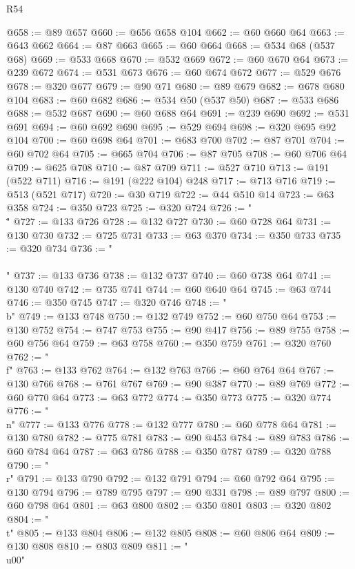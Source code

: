 \begin{lexlean}{R54}
\begin{coremodule}
@658 := @89 @657
@660 := @656 @658 @104
@662 := @60 @660 @64
@663 := @643 @662
@664 := @87 @663
@665 := @60 @664
@668 := @534 @68 (@537 @68)
@669 := @533 @668
@670 := @532 @669
@672 := @60 @670 @64
@673 := @239 @672
@674 := @531 @673
@676 := @60 @674 @672
@677 := @529 @676
@678 := @320 @677
@679 := @90 @71
@680 := @89 @679
@682 := @678 @680 @104
@683 := @60 @682
@686 := @534 @50 (@537 @50)
@687 := @533 @686
@688 := @532 @687
@690 := @60 @688 @64
@691 := @239 @690
@692 := @531 @691
@694 := @60 @692 @690
@695 := @529 @694
@698 := @320 @695 @92 @104
@700 := @60 @698 @64
@701 := @683 @700
@702 := @87 @701
@704 := @60 @702 @64
@705 := @665 @704
@706 := @87 @705
@708 := @60 @706 @64
@709 := @625 @708
@710 := @87 @709
@711 := @527 @710
@713 := @191 (@522 @711)
@716 := @191 (@222 @104) @248
@717 := @713 @716
@719 := @513 (@521 @717)
@720 := @30 @719
@722 := @44 @510 @14
@723 := @63 @358
@724 := @350 @723
@725 := @320 @724
@726 := "\\\""
@727 := @133 @726
@728 := @132 @727
@730 := @60 @728 @64
@731 := @130 @730
@732 := @725 @731
@733 := @63 @370
@734 := @350 @733
@735 := @320 @734
@736 := "\\\\"
@737 := @133 @736
@738 := @132 @737
@740 := @60 @738 @64
@741 := @130 @740
@742 := @735 @741
@744 := @60 @640 @64
@745 := @63 @744
@746 := @350 @745
@747 := @320 @746
@748 := "\\b"
@749 := @133 @748
@750 := @132 @749
@752 := @60 @750 @64
@753 := @130 @752
@754 := @747 @753
@755 := @90 @417
@756 := @89 @755
@758 := @60 @756 @64
@759 := @63 @758
@760 := @350 @759
@761 := @320 @760
@762 := "\\f"
@763 := @133 @762
@764 := @132 @763
@766 := @60 @764 @64
@767 := @130 @766
@768 := @761 @767
@769 := @90 @387
@770 := @89 @769
@772 := @60 @770 @64
@773 := @63 @772
@774 := @350 @773
@775 := @320 @774
@776 := "\\n"
@777 := @133 @776
@778 := @132 @777
@780 := @60 @778 @64
@781 := @130 @780
@782 := @775 @781
@783 := @90 @453
@784 := @89 @783
@786 := @60 @784 @64
@787 := @63 @786
@788 := @350 @787
@789 := @320 @788
@790 := "\\r"
@791 := @133 @790
@792 := @132 @791
@794 := @60 @792 @64
@795 := @130 @794
@796 := @789 @795
@797 := @90 @331
@798 := @89 @797
@800 := @60 @798 @64
@801 := @63 @800
@802 := @350 @801
@803 := @320 @802
@804 := "\\t"
@805 := @133 @804
@806 := @132 @805
@808 := @60 @806 @64
@809 := @130 @808
@810 := @803 @809
@811 := "\\u00"

\end{coremodule}
\end{lexlean}
